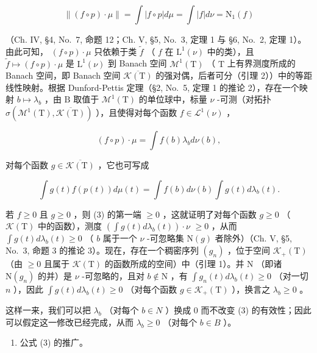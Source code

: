 \[
\left\| (f \circ p) \cdot \mu \right\| = \int | f \circ p | d \mu = \int | f | d \nu = \mathrm{N} _ {1} (f)
\]

（Ch. IV, §4, No.~7, 命题 12；Ch. V, §5, No.~3, 定理 1 与 §6, No.~2, 定理 1）。由此可知， \((f \circ p) \cdot \mu\) 只依赖于类 \(\widetilde{f}\) （ \(f\) 在 \(\mathrm{L}^1(\nu)\) 中的类），且 \(\widetilde{f} \mapsto (f \circ p) \cdot \mu\) 是 \(\mathrm{L}^1(\nu)\) 到 Banach 空间 \(\mathcal{M}^1(\mathrm{T})\) （ \(\mathrm{T}\) 上有界测度所成的 Banach 空间，即 Banach 空间 \(\overline{\mathcal{K}(\mathrm{T})}\) 的强对偶，后者可分（引理 2））中的等距线性映射。根据 Dunford-Pettis 定理（§2, No.~5, 定理 1 的推论 2），存在一个映射 \(b \mapsto \lambda_b\) ，由 \(\mathrm{B}\) 取值于 \(\mathcal{M}^1(\mathrm{T})\) 的单位球中，标量 \(\nu\) -可测（对拓扑 \(\sigma(\mathcal{M}^1(\mathrm{T}), \overline{\mathcal{K}(\mathrm{T})})\) ），且使得对每个函数 \(f \in \mathcal{L}^1(\nu)\) ，

\[
(f \circ p) \cdot \mu = \int f (b) \lambda_ {b} d \nu (b),\tag{2}
\]

对每个函数 \(g \in \overline{\mathcal{K}(\mathrm{T})}\) ，它也可写成

\[
\int g (t) f (p (t)) d \mu (t) = \int f (b) d \nu (b) \int g (t) d \lambda_ {b} (t).\tag{3}
\]

若 \(f \geqslant 0\) 且 \(g \geqslant 0\) ，则 (3) 的第一端 \(\geqslant 0\) ，这就证明了对每个函数 \(g \geqslant 0\) （ \(\mathcal{K}(\mathrm{T})\) 中的函数），测度 \(\left( \int g(t) d\lambda_b(t) \right) \cdot \nu\) \(\geqslant 0\) ，从而 \(\int g(t) d\lambda_b(t) \geqslant 0\) （ \(b\) 属于一个 \(\nu\) -可忽略集 \(\mathrm{N}(g)\) 者除外）（Ch. V, §5, No.~3, 命题 3 的推论 3）。现在，存在一个稠密序列 \((g_n)\) ，位于空间 \(\mathcal{K}_+(\mathrm{T})\) （由 \(\geqslant 0\) 且属于 \(\mathcal{K}(\mathrm{T})\) 的函数所成的空间）中（引理 1）。并 \(\mathrm{N}\) （即诸 \(\mathrm{N}(g_n)\) 的并）是 \(\nu\) -可忽略的，且对 \(b \notin \mathrm{N}\) ，有 \(\int g_n(t) d\lambda_b(t) \geqslant 0\) （对一切 \(n\) ），因此 \(\int g(t) d\lambda_b(t) \geqslant 0\) （对每个函数 \(g \in \mathcal{K}_+(\mathrm{T})\) ），换言之 \(\lambda_b \geqslant 0\) 。

这样一来，我们可以把 \(\lambda_{b}\) （对每个 \(b \in N\) ）换成 0 而不改变 (3) 的有效性；因此可以假定这一修改已经完成，从而 \(\lambda_{b} \geqslant 0\) （对每个 \(b \in B\) ）。

\begin{enumerate}
\def\labelenumi{\arabic{enumi})}
\setcounter{enumi}{2}
\tightlist
\item
  公式 (3) 的推广。
\end{enumerate}

